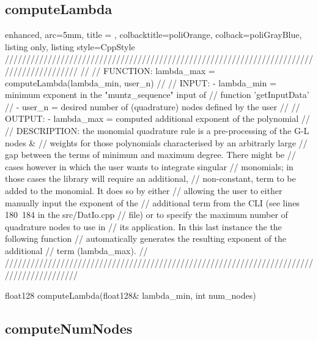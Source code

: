 \documentclass[a4paper, twosided]{book}
\begin{document}
\newpage
\subsection[computeLambda]{\changefont computeLambda}\label{SubSec4.1.2}

\begin{tcblisting}{enhanced,
                   arc=5mm,
                   title = \color{black}{\large \ttfamily MonMap.cpp/computeLambda},
                   colbacktitle=poliOrange,
                   colback=poliGrayBlue,
                   listing only,
                   listing style=CppStyle}
/////////////////////////////////////////////////////////////////////////////////////////
//
//       FUNCTION: lambda_max = computeLambda(lambda_min, user_n)
//                
//          INPUT: - lambda_min = minimum exponent in the "muntz_sequence" input of 
//                   function 'getInputData'
//                 - user_n = desired number of (quadrature) nodes defined by the user
//
//         OUTPUT: - lambda_max = computed additional exponent of the polynomial
//
//    DESCRIPTION: the monomial quadrature rule is a pre-processing of the G-L nodes & 
//                 weights for those polynomials characterised by an arbitrarly large
//                 gap between the terms of minimum and maximum degree. There might be
//                 cases however in which the user wants to integrate singular 
//                 monomials; in those cases the library will require an additional, 
//                 non-constant, term to be added to the monomial. It does so by either 
//                 allowing the user to either manually input the exponent of the 
//                 additional term from the CLI (see lines 180~184 in the src/DatIo.cpp
//                 file) or to specify the maximum number of quadrature nodes to use in
//                 its application. In this last instance the the following function 
//                 automatically generates the resulting exponent of the additional
//                 term (lambda_max).
//
/////////////////////////////////////////////////////////////////////////////////////////

float128 computeLambda(float128& lambda_min, int num_nodes)
\end{tcblisting}

\subsection[computeNumNodes]{\changefont computeNumNodes}\label{SubSec4.1.3}
\end{document}
